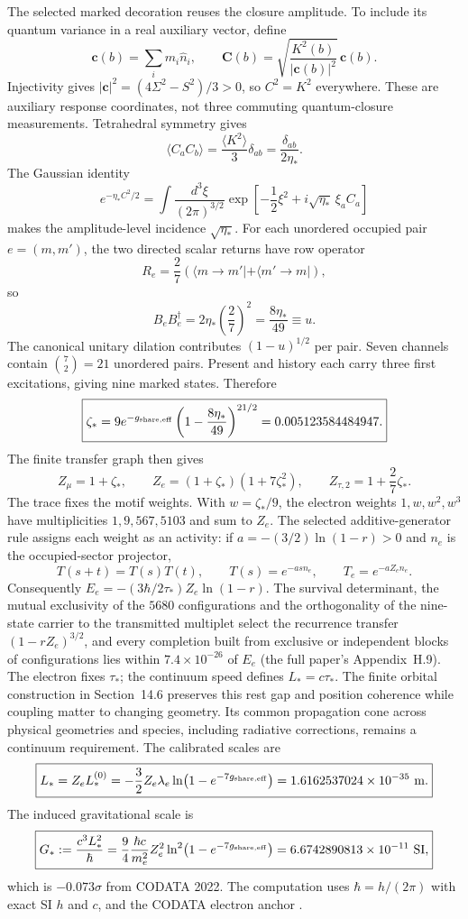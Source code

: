 \documentclass[11pt]{article}
\begin{document}
The selected marked decoration reuses the closure amplitude. To include its quantum variance in a real auxiliary vector, define
\[
\mathbf c(b)=\sum_i m_i\hat n_i,\qquad
\mathbf C(b)=\sqrt{\frac{K^2(b)}{|\mathbf c(b)|^2}}\,\mathbf c(b).
\]
Injectivity gives $|\mathbf c|^2=(4\Sigma^2-S^2)/3>0$, so $C^2=K^2$ everywhere. These are auxiliary response coordinates, not three commuting quantum-closure measurements. Tetrahedral symmetry gives
\[
\langle C_aC_b\rangle=\frac{\langle K^2\rangle}{3}\delta_{ab}
=\frac{\delta_{ab}}{2\eta_*}.
\]
The Gaussian identity
\[
e^{-\eta_*C^2/2}
=\int\frac{d^3\xi}{(2\pi)^{3/2}}
\exp\!\left[-\frac12\xi^2+i\sqrt{\eta_*}\,\xi_aC_a\right]
\]
makes the amplitude-level incidence $\sqrt{\eta_*}$. For each unordered occupied pair $e=(m,m')$, the two directed scalar returns have row operator
\[
R_e=\frac27\left(\langle m\to m'|+\langle m'\to m|\right),
\]
so
\[
B_eB_e^\dagger
=2\eta_*\left(\frac27\right)^2
=\frac{8\eta_*}{49}\equiv u.
\]
The canonical unitary dilation contributes $(1-u)^{1/2}$ per pair. Seven channels contain $\binom72=21$ unordered pairs. Present and history each carry three first excitations, giving nine marked states. Therefore
\[
\boxed{
\zeta_*
=9e^{-g_{\rm share,eff}}
\left(1-\frac{8\eta_*}{49}\right)^{21/2}
=0.005123584484947.
}
\]
The finite transfer graph then gives
\[
Z_\mu=1+\zeta_*,
\qquad
\boxed{Z_e=(1+\zeta_*)(1+7\zeta_*^2)},
\qquad
Z_{\tau,2}=1+\frac27\zeta_*.
\]
The trace fixes the motif weights. With $w=\zeta_*/9$, the electron weights $1,w,w^2,w^3$ have multiplicities $1,9,567,5103$ and sum to $Z_e$. The selected additive-generator rule assigns each weight as an activity: if $a=-(3/2)\ln(1-r)>0$ and $n_e$ is the occupied-sector projector,
\[
T(s+t)=T(s)T(t),\qquad T(s)=e^{-as n_e},
\qquad T_e=e^{-aZ_en_e}.
\]
Consequently $E_e=-(3\hbar/2\tau_*)Z_e\ln(1-r)$. The survival determinant, the mutual exclusivity of the $5680$ configurations and the orthogonality of the nine-state carrier to the transmitted multiplet select the recurrence transfer $(1-rZ_e)^{3/2}$, and every completion built from exclusive or independent blocks of configurations lies within $7.4\times10^{-26}$ of $E_e$ (the full paper's Appendix~H.9). The electron fixes $\tau_*$; the continuum speed defines $L_*=c\tau_*$. The finite orbital construction in Section~14.6 preserves this rest gap and position coherence while coupling matter to changing geometry. Its common propagation cone across physical geometries and species, including radiative corrections, remains a continuum requirement. The calibrated scales are
\[
\boxed{
L_*=Z_eL_*^{(0)}
=-\frac32Z_e\lambda_e
\ln\!\left(1-e^{-7g_{\rm share,eff}}\right)
=1.6162537024\times10^{-35}\ {\rm m}.
}
\]
The induced gravitational scale is
\[
\boxed{
G_*:=\frac{c^3L_*^2}{\hbar}
=\frac94\frac{\hbar c}{m_e^2}
Z_e^2\ln^2\!\left(1-e^{-7g_{\rm share,eff}}\right)
=6.6742890813\times10^{-11}\ \mathrm{SI},
}
\]
which is $-0.073\sigma$ from CODATA 2022. The computation uses $\hbar=h/(2\pi)$ with exact SI $h$ and $c$, and the CODATA electron anchor \citep{CODATA2022Astra}.
\end{document}
